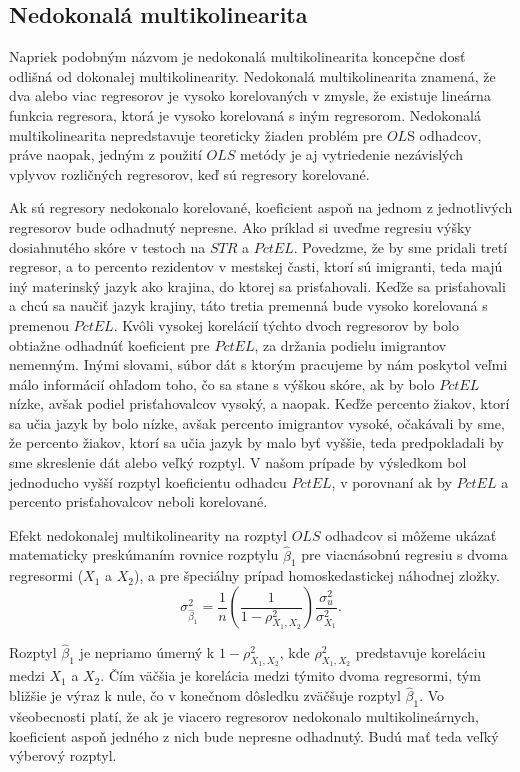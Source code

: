 \documentclass[]{tukediphc}
\begin{document}
\subsection{Nedokonalá multikolinearita}

Napriek podobným názvom je nedokonalá multikolinearita koncepčne dosť odlišná od dokonalej multikolinearity. Nedokonalá multikolinearita znamená, že dva alebo viac regresorov je vysoko korelovaných v zmysle, že existuje lineárna funkcia regresora, ktorá je vysoko korelovaná s iným regresorom. Nedokonalá multikolinearita nepredstavuje teoreticky žiaden problém pre $OL$S odhadcov, práve naopak, jedným z použití $OLS$ metódy je aj vytriedenie nezávislých vplyvov rozličných regresorov, keď sú regresory korelované. 

Ak sú regresory nedokonalo korelované, koeficient aspoň na jednom z jednotlivých regresorov bude odhadnutý nepresne. Ako príklad si uveďme regresiu výšky dosiahnutého skóre v testoch na $STR$ a $PctEL$. Povedzme, že by sme pridali tretí regresor, a to percento rezidentov v mestskej časti, ktorí sú imigranti, teda majú iný materinský jazyk ako krajina, do ktorej sa prisťahovali. Keďže sa prisťahovali a chcú sa naučiť jazyk krajiny, táto tretia premenná bude vysoko korelovaná s premenou $PctEL$. Kvôli vysokej korelácií týchto dvoch regresorov by bolo obtiažne odhadnúť koeficient pre $PctEL$, za držania podielu imigrantov nemenným. Inými slovami, súbor dát s ktorým pracujeme by nám poskytol veľmi málo informácií ohľadom toho, čo sa stane s výškou skóre, ak by bolo $PctEL$ nízke, avšak podiel prisťahovalcov vysoký, a naopak. Keďže percento žiakov, ktorí sa učia jazyk by bolo nízke, avšak percento imigrantov vysoké, očakávali by sme, že percento žiakov, ktorí sa učia jazyk by malo byť vyššie, teda predpokladali by sme skreslenie dát alebo veľký rozptyl. V našom prípade by výsledkom bol jednoducho vyšší rozptyl koeficientu odhadcu $PctEL$, v porovnaní ak by $PctEL$ a percento prisťahovalcov neboli korelované. 

Efekt nedokonalej multikolinearity na rozptyl $OLS$ odhadcov si môžeme ukázať matematicky preskúmaním rovnice rozptylu $\hat\beta_{1}$ pre viacnásobnú regresiu s dvoma regresormi ($X_1$ a $X_2$), a pre špeciálny prípad homoskedastickej náhodnej zložky.
\begin{equation}
    \sigma_{\hat\beta_{1}}^2 = \frac{1}{n}\left(\frac{1}{1-\rho_{X_{1}, X_{2}}^2}\right)\frac{\sigma_{u}^2}{\sigma_{X_{1}}^2}.
\end{equation}

Rozptyl $\hat\beta_{1}$ je nepriamo úmerný k $1-\rho_{X_{1}, X_{2}}^2$, kde $\rho_{X_{1}, X_{2}}^2$ predstavuje koreláciu medzi $X_1$ a $X_2$. Čím väčšia je korelácia medzi týmito dvoma regresormi, tým bližšie je výraz k nule, čo v konečnom dôsledku zväčšuje rozptyl $\hat\beta_{1}$. Vo všeobecnosti platí, že ak je viacero regresorov nedokonalo multikolineárnych, koeficient aspoň jedného z nich bude nepresne odhadnutý. Budú mať teda veľký výberový rozptyl. 
\end{document}
